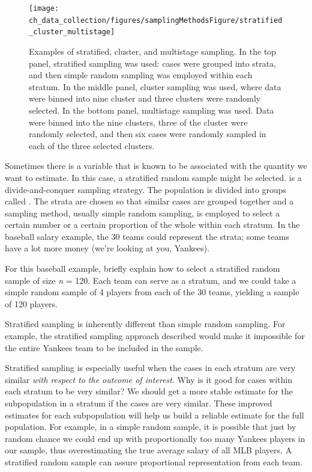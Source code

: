 \begin{figure}
\centering
\texttt{[image: ch\_data\_collection/figures/samplingMethodsFigure/stratified\_cluster\_multistage]}
\caption{Examples of stratified, cluster, and multistage sampling. In the top panel, stratified sampling was used: cases were grouped into strata, and then simple random sampling was employed within each stratum. In the middle panel, cluster sampling was used, where data were binned into nine cluster and three clusters were randomly selected. In the bottom panel, multistage sampling was used. Data were binned into the nine clusters, three of the cluster were randomly selected, and then six cases were randomly sampled in each of the three selected clusters.}
\label{stratified_cluster_multistage}
\end{figure}

Sometimes there is a variable that is known to be associated with the quantity we want to estimate. In this case, a stratified random sample might be selected.  is a divide-and-conquer sampling strategy. The population is divided into groups called . The strata are chosen so that similar cases are grouped together and a sampling method, usually simple random sampling, is employed to select a certain number or a certain proportion of the whole within each stratum. In the baseball salary example, the 30 teams could represent the strata; some teams have a lot more money (we're looking at you, Yankees).

\begin{example}{For this baseball example, briefly explain how to select a stratified random sample of size \textit{n} = 120. }
Each team can serve as a stratum, and we could take a simple random sample of 4 players from each of the 30 teams, yielding a sample of 120 players.
\end{example}

Stratified sampling is inherently different than simple random sampling. For example, the stratified sampling approach described would make it impossible for the entire Yankees team to be included in the sample.

\begin{example}{Stratified sampling is especially useful when the cases in each stratum are very similar \emph{with respect to the outcome of interest}. Why is it good for cases within each stratum to be very similar?}
We should get a more stable estimate for the subpopulation in a stratum if the cases are very similar. These improved estimates for each subpopulation will help us build a reliable estimate for the full population. For example, in a simple random sample, it is possible that just by random chance we could end up with proportionally too many Yankees players in our sample, thus overestimating the true average salary of all MLB players. A stratified random sample can assure proportional representation from each team.
\end{example}

